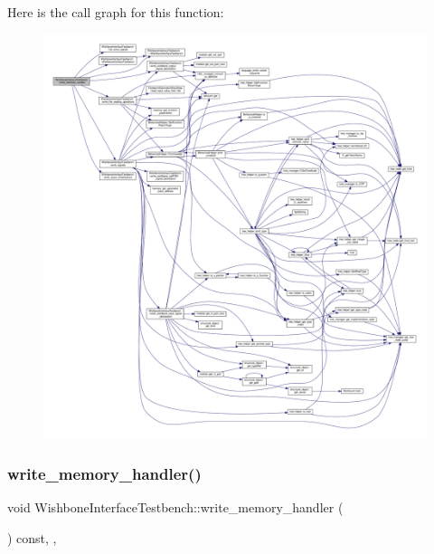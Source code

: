 Here is the call graph for this function\+:
\nopagebreak
\begin{figure}[H]
\begin{center}
\leavevmode
\includegraphics[width=350pt]{de/ded/classWishboneInterfaceTestbench_a8a656572943eb09c0da774d124ab7a05_cgraph}
\end{center}
\end{figure}
\mbox{\label{classWishboneInterfaceTestbench_aa94678609b7c8f3c402a0642776f9fda}} 
\subsubsection{\texorpdfstring{write\+\_\+memory\+\_\+handler()}{write\_memory\_handler()}}
{\footnotesize\ttfamily void Wishbone\+Interface\+Testbench\+::write\+\_\+memory\+\_\+handler (\begin{DoxyParamCaption}{ }\end{DoxyParamCaption}) const\hspace{0.3cm}{\ttfamily [override]}, {\ttfamily [protected]}, {\ttfamily [virtual]}}



